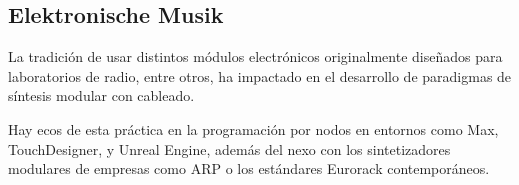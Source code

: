 \documentclass[../candidatura.tex]{subfiles}
\begin{document}
\subsection{Elektronische Musik}

La tradición de usar distintos módulos electrónicos originalmente diseñados para laboratorios de radio, entre otros, ha impactado en el desarrollo de paradigmas de síntesis modular con cableado.

Hay ecos de esta práctica en la programación por nodos en entornos como Max, TouchDesigner, y Unreal Engine, además del nexo con los sintetizadores modulares de empresas como ARP o los estándares Eurorack contemporáneos.

\newpage
\end{document}
